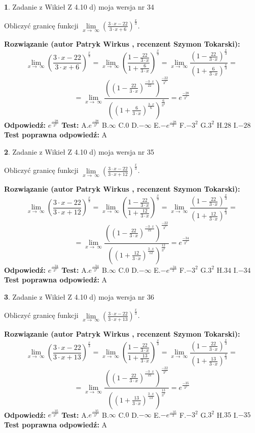 \documentclass[12pt, a4paper]{article}
\theoremstyle{definition} %
\newtheorem{zad}{}
\newcommand{\zadStart}[1]{\begin{zad}#1\newline}
\newcommand{\zadStop}{\end{zad}}
\newcommand{\rozwStart}[2]{\noindent \textbf{Rozwiązanie (autor #1 , recenzent #2): }\newline}
\newcommand{\rozwStop}{\newline}
\newcommand{\odpStart}{\noindent \textbf{Odpowiedź:}\newline}
\newcommand{\odpStop}{\newline}
\newcommand{\testStart}{\noindent \textbf{Test:}\newline}
\newcommand{\testStop}{\newline}
\newcommand{\kluczStart}{\noindent \textbf{Test poprawna odpowiedź:}\newline}
\newcommand{\kluczStop}{\newline}
\begin{document}
\zadStart{Zadanie z Wikieł Z 4.10 d) moja wersja nr 34}


Obliczyć granicę funkcji  $\lim\limits_{x\to\ \infty}(\frac{3\cdot x-22}{3\cdot x+6})^{\frac{x}{3}}$.
\zadStop
\rozwStart{Patryk Wirkus}{Szymon Tokarski}
$$\lim\limits_{x\to\ \infty}(\frac{3\cdot x-22}{3\cdot x+6})^{\frac{x}{3}} = \lim\limits_{x\to\ \infty}(\frac{1-\frac{22}{3\cdot x}}{1+\frac{6}{3\cdot x}})^{\frac{x}{3}}=\lim\limits_{x\to\ \infty}\frac{(1-\frac{22}{3\cdot x})^{\frac{x}{3}}}{(1+\frac{6}{3\cdot x})^{\frac{x}{3}}}=$$
$$=\lim\limits_{x\to\ \infty}\frac{((1-\frac{22}{3\cdot x})^{\frac{-3\cdot x}{22}})^{\frac{-22}{3^{2}}}}{((1+\frac{6}{3\cdot x})^{\frac{3\cdot x}{6}})^{\frac{6}{3^{2}}}}=e^{\frac{-28}{3^{2}}}$$
\rozwStop
\odpStart
$e^{\frac{-28}{3^{2}}}$
\odpStop
\testStart
A.$e^{\frac{-28}{3^{2}}}$ B.$\infty$ C.$0$ D.$-\infty$ E.$-e^{\frac{-28}{3}}$
F.$-3^{2}$ G.$3^{2}$
H.$28$
I.$-28$
\testStop
\kluczStart
A
\kluczStop



\zadStart{Zadanie z Wikieł Z 4.10 d) moja wersja nr 35}


Obliczyć granicę funkcji  $\lim\limits_{x\to\ \infty}(\frac{3\cdot x-22}{3\cdot x+12})^{\frac{x}{3}}$.
\zadStop
\rozwStart{Patryk Wirkus}{Szymon Tokarski}
$$\lim\limits_{x\to\ \infty}(\frac{3\cdot x-22}{3\cdot x+12})^{\frac{x}{3}} = \lim\limits_{x\to\ \infty}(\frac{1-\frac{22}{3\cdot x}}{1+\frac{12}{3\cdot x}})^{\frac{x}{3}}=\lim\limits_{x\to\ \infty}\frac{(1-\frac{22}{3\cdot x})^{\frac{x}{3}}}{(1+\frac{12}{3\cdot x})^{\frac{x}{3}}}=$$
$$=\lim\limits_{x\to\ \infty}\frac{((1-\frac{22}{3\cdot x})^{\frac{-3\cdot x}{22}})^{\frac{-22}{3^{2}}}}{((1+\frac{12}{3\cdot x})^{\frac{3\cdot x}{12}})^{\frac{12}{3^{2}}}}=e^{\frac{-34}{3^{2}}}$$
\rozwStop
\odpStart
$e^{\frac{-34}{3^{2}}}$
\odpStop
\testStart
A.$e^{\frac{-34}{3^{2}}}$ B.$\infty$ C.$0$ D.$-\infty$ E.$-e^{\frac{-34}{3}}$
F.$-3^{2}$ G.$3^{2}$
H.$34$
I.$-34$
\testStop
\kluczStart
A
\kluczStop



\zadStart{Zadanie z Wikieł Z 4.10 d) moja wersja nr 36}


Obliczyć granicę funkcji  $\lim\limits_{x\to\ \infty}(\frac{3\cdot x-22}{3\cdot x+13})^{\frac{x}{3}}$.
\zadStop
\rozwStart{Patryk Wirkus}{Szymon Tokarski}
$$\lim\limits_{x\to\ \infty}(\frac{3\cdot x-22}{3\cdot x+13})^{\frac{x}{3}} = \lim\limits_{x\to\ \infty}(\frac{1-\frac{22}{3\cdot x}}{1+\frac{13}{3\cdot x}})^{\frac{x}{3}}=\lim\limits_{x\to\ \infty}\frac{(1-\frac{22}{3\cdot x})^{\frac{x}{3}}}{(1+\frac{13}{3\cdot x})^{\frac{x}{3}}}=$$
$$=\lim\limits_{x\to\ \infty}\frac{((1-\frac{22}{3\cdot x})^{\frac{-3\cdot x}{22}})^{\frac{-22}{3^{2}}}}{((1+\frac{13}{3\cdot x})^{\frac{3\cdot x}{13}})^{\frac{13}{3^{2}}}}=e^{\frac{-35}{3^{2}}}$$
\rozwStop
\odpStart
$e^{\frac{-35}{3^{2}}}$
\odpStop
\testStart
A.$e^{\frac{-35}{3^{2}}}$ B.$\infty$ C.$0$ D.$-\infty$ E.$-e^{\frac{-35}{3}}$
F.$-3^{2}$ G.$3^{2}$
H.$35$
I.$-35$
\testStop
\kluczStart
A
\kluczStop
\end{document}
